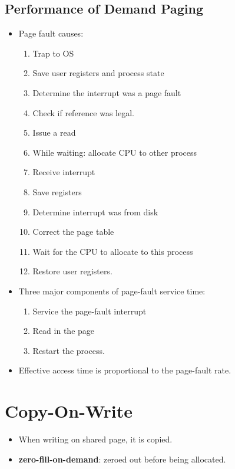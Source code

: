 \documentclass[10pt]{report}
\begin{document}
		\subsection{Performance of Demand Paging}
			\begin{itemize}
				\item Page fault causes:
				\begin{enumerate}
					\item Trap to OS
					\item Save user registers and process state
					\item Determine the interrupt was a page fault
					\item Check if reference was legal.
					\item Issue a read
					\item While waiting: allocate CPU to other process
					\item Receive interrupt
					\item Save registers
					\item Determine interrupt was from disk
					\item Correct the page table
					\item Wait for the CPU to allocate to this process
					\item Restore user registers.
				\end{enumerate}
				\item Three major components of page-fault service time:
				\begin{enumerate}
					\item Service the page-fault interrupt
					\item Read in the page
					\item Restart the process.
				\end{enumerate}
				\item Effective access time is proportional to the page-fault rate.
			\end{itemize}

	\section{Copy-On-Write}
		\begin{itemize}
			\item When writing on shared page, it is copied.
			\item \textbf{zero-fill-on-demand}: zeroed out before being allocated.
		\end{itemize}
\end{document}
